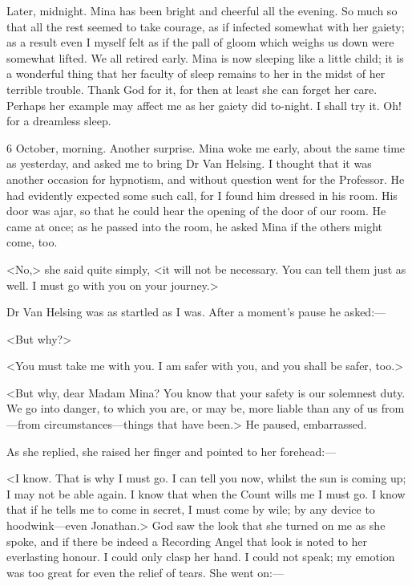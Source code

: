 \begin{diary}{Later, midnight.}
Mina has been bright and cheerful all the evening. So much so that all the rest seemed to take courage, as if infected somewhat with her gaiety; as a result even I myself felt as if the pall of gloom which weighs us down were somewhat lifted. We all retired early. Mina is now sleeping like a little child; it is a wonderful thing that her faculty of sleep remains to her in the midst of her terrible trouble. Thank God for it, for then at least she can forget her care. Perhaps her example may affect me as her gaiety did to-night. I shall try it. Oh! for a dreamless sleep.
\end{diary}
 

\begin{diary}{6 October, morning.}
Another surprise. Mina woke me early, about the same time as yesterday, and asked me to bring Dr Van Helsing. I thought that it was another occasion for hypnotism, and without question went for the Professor. He had evidently expected some such call, for I found him dressed in his room. His door was ajar, so that he could hear the opening of the door of our room. He came at once; as he passed into the room, he asked Mina if the others might come, too.

<No,> she said quite simply, <it will not be necessary. You can tell them just as well. I must go with you on your journey.>

Dr Van Helsing was as startled as I was. After a moment's pause he asked:—

<But why?>

<You must take me with you. I am safer with you, and you shall be safer, too.>

<But why, dear Madam Mina? You know that your safety is our solemnest duty. We go into danger, to which you are, or may be, more liable than any of us from—from circumstances—things that have been.> He paused, embarrassed.

As she replied, she raised her finger and pointed to her forehead:—

<I know. That is why I must go. I can tell you now, whilst the sun is coming up; I may not be able again. I know that when the Count wills me I must go. I know that if he tells me to come in secret, I must come by wile; by any device to hoodwink—even Jonathan.> God saw the look that she turned on me as she spoke, and if there be indeed a Recording Angel that look is noted to her everlasting honour. I could only clasp her hand. I could not speak; my emotion was too great for even the relief of tears. She went on:—


\end{diary}
